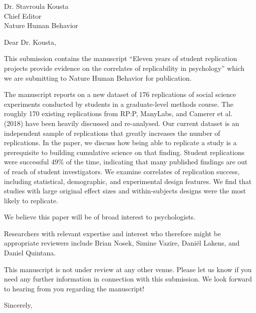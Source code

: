 \documentclass{stanfordletter}
\begin{document}
	\signature{Veronica Boyce \\ Maya Mathur \\ Michael C. Frank}
	
	
	\begin{letter}{Dr. Stavroula Kousta \\ Chief Editor \\ Nature Human Behavior}
		
		
          \opening{Dear Dr. Kousta,} 
          This
          submission contains the manuscript ``Eleven years of student replication projects provide evidence on
          the correlates of replicability in psychology''
          which we are submitting to Nature Human Behavior for
          publication. 
          
          The manuscript reports on a new dataset of 176 replications of social science experiments conducted by students in a graduate-level methods course. The roughly 170 existing replications from RP:P, ManyLabs, and Camerer et al. (2018) have been heavily discussed and re-analysed. Our current dataset is an independent sample of replications that greatly increases the number of replications.  In the paper, we discuss how being able to replicate a study is a prerequisite to building cumulative science on that finding. Student replications were successful 49\% of the time, indicating that many published findings are out of reach of student investigators.    We examine correlates of replication success, including   statistical, demographic, and  experimental design features.  We find that studies with large original effect sizes and within-subjects designs were the most likely to replicate. 
          
          We believe this paper will be of broad
          interest to psychologists.
		 
          Researchers with relevant expertise and interest who
          therefore might be appropriate reviewers include Brian Nosek, Simine Vazire, Dani\"{e}l Lakens, and Daniel Quintana. 
		 
          This manuscript is not under review at any other
          venue. Please let us know if you need any further
          information in connection with this submission. We look
          forward to hearing from you regarding the manuscript!
          \closing{Sincerely,}
		
	\end{letter}
	
\end{document}
